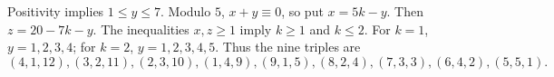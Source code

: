 Positivity implies $1\le y\le7$. Modulo $5$, $x+y\equiv0$, so put $x=5k-y$. Then $z=20-7k-y$. The inequalities $x,z\ge1$ imply $k\ge1$ and $k\le2$. For $k=1$, $y=1,2,3,4$; for $k=2$, $y=1,2,3,4,5$. Thus the nine triples are
\[
\boxed{(4,1,12),(3,2,11),(2,3,10),(1,4,9),
(9,1,5),(8,2,4),(7,3,3),(6,4,2),(5,5,1)}.
\]
